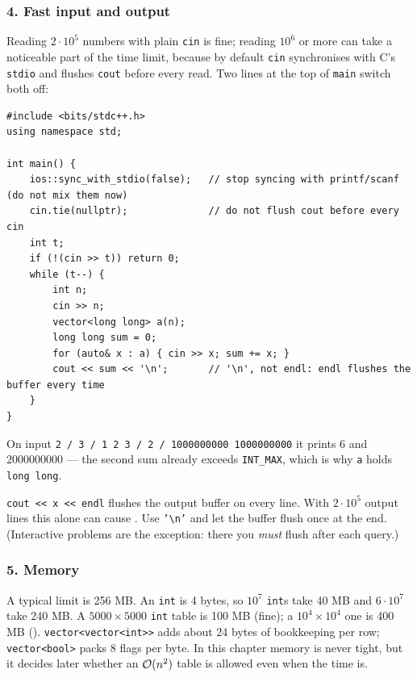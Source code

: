 \subsubsection*{4. Fast input and output}

Reading $2\cdot10^5$ numbers with plain \texttt{cin} is fine; reading $10^6$ or more can take a noticeable part of the time limit, because by default \texttt{cin} synchronises with C's \texttt{stdio} and flushes \texttt{cout} before every read. Two lines at the top of \texttt{main} switch both off:

\begin{lstlisting}[style=cpp]
#include <bits/stdc++.h>
using namespace std;

int main() {
    ios::sync_with_stdio(false);   // stop syncing with printf/scanf (do not mix them now)
    cin.tie(nullptr);              // do not flush cout before every cin
    int t;
    if (!(cin >> t)) return 0;
    while (t--) {
        int n;
        cin >> n;
        vector<long long> a(n);
        long long sum = 0;
        for (auto& x : a) { cin >> x; sum += x; }
        cout << sum << '\n';       // '\n', not endl: endl flushes the buffer every time
    }
}
\end{lstlisting}

On input \texttt{2 / 3 / 1 2 3 / 2 / 1000000000 1000000000} it prints $6$ and $2000000000$ --- the second sum already exceeds \texttt{INT\_MAX}, which is why \texttt{a} holds \texttt{long long}.

\begin{warningbox}
\texttt{cout << x << endl} flushes the output buffer on every line. With $2\cdot10^5$ output lines this alone can cause \tle{}. Use \texttt{'\textbackslash n'} and let the buffer flush once at the end. (Interactive problems are the exception: there you \emph{must} flush after each query.)
\end{warningbox}

\subsubsection*{5. Memory}

A typical limit is 256 MB. An \texttt{int} is 4 bytes, so $10^7$ \texttt{int}s take 40 MB and $6\cdot10^7$ take 240 MB. A $5000 \times 5000$ \texttt{int} table is 100 MB (fine); a $10^4 \times 10^4$ one is 400 MB (\mle). \texttt{vector<vector<int>>} adds about 24 bytes of bookkeeping per row; \texttt{vector<bool>} packs 8 flags per byte. In this chapter memory is never tight, but it decides later whether an $\mathcal{O}(n^2)$ table is allowed even when the time is.

